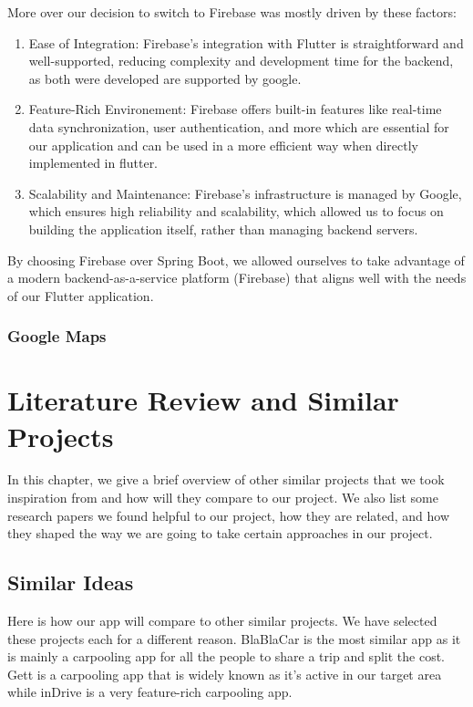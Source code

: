 \documentclass[a4paper, 12pt]{report} %
\begin{document}
                More over our decision to switch to Firebase was mostly driven by these factors:
                \begin{enumerate}
                    \item \raggedright Ease of Integration: Firebase’s integration with Flutter is straightforward and well-supported, reducing complexity and development time for the backend, as both were developed are supported by google.
                    \item Feature-Rich Environement: Firebase offers built-in features like real-time data synchronization, user authentication, and more which are essential for our application and can be used in a more efficient way when directly implemented in flutter.
                    \item Scalability and Maintenance: Firebase’s infrastructure is managed by Google, which ensures high reliability and scalability,  which allowed us to focus on building the application itself, rather than managing backend servers.
                \end{enumerate}

                By choosing Firebase over Spring Boot, we allowed ourselves to take advantage of a modern backend-as-a-service platform (Firebase) that aligns well with the needs of our Flutter application. 

        \subsubsection{Google Maps}


    \pagebreak
    
    \section{Literature Review and Similar Projects}
        In this chapter, we give a brief overview of other similar projects that we took inspiration from and how will they compare to our project. We also list some research papers we found helpful to our project, how they are related, and how they shaped the way we are going to take certain approaches in our project.
        \subsection{Similar Ideas}
            Here is how our app will compare to other similar projects. We have selected these projects each for a different reason. BlaBlaCar is the most similar app as it is mainly a carpooling app for all the people to share a trip and split the cost. Gett is a carpooling app that is widely known as it's active in our target area while inDrive is a very feature-rich carpooling app.
\end{document}
